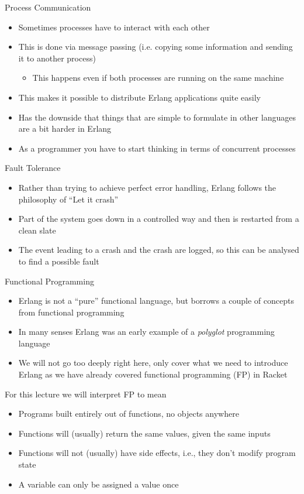 \documentclass[12pt,xcolor=svgnames]{beamer}
\begin{document}
\begin{frame}{Process Communication}
\begin{itemize}
\item Sometimes processes have to interact with each other
\item This is done via message passing (i.e. copying some information and sending it to another process)
\begin{itemize}
\item This happens even if both processes are running on the same machine
\end{itemize}
\item This makes it possible to distribute Erlang applications quite easily
\item Has the downside that things that are simple to formulate in other languages are a bit harder in Erlang
\item As a programmer you have to start thinking in terms of concurrent processes
\end{itemize}
\end{frame}

\begin{frame}{Fault Tolerance}
\begin{itemize}
\item Rather than trying to achieve perfect error handling, Erlang follows the philosophy of ``Let it crash''
\item Part of the system goes down in a controlled way and then is restarted from a clean slate
\item The event leading to a crash and the crash are logged, so this can be analysed to find a possible fault
\end{itemize}
\end{frame}

\begin{frame}{Functional Programming}
\begin{itemize}
\item Erlang is not a ``pure'' functional language, but borrows a couple of concepts from functional programming
\item In many senses Erlang was an early example of a \emph{polyglot} programming language
\item We will not go too deeply right here, only cover what we need to introduce Erlang
as we have already covered functional programming (FP) in Racket
\end{itemize}

\framebreak

For this lecture we will interpret FP to mean
\begin{itemize}
\item Programs built entirely out of functions, no objects anywhere
\item Functions will (usually) return the same values, given the same inputs
\item Functions will not (usually) have side effects, i.e., they don't modify program state
\item A variable can only be assigned a value once
\end{itemize}
\end{frame}
\end{document}

